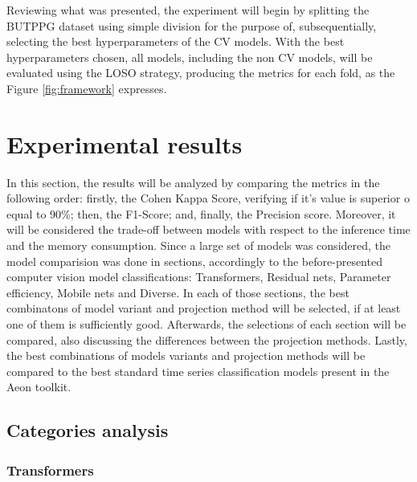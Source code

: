 

Reviewing what was presented, the experiment will begin by splitting the \acrshort{BUTPPG} dataset using simple division for the purpose of, subsequentially, selecting the best hyperparameters of the \acrshort{CV} models. With the best hyperparameters chosen, all models, including the non \acrshort{CV} models, will be evaluated using the \acrshort{LOSO} strategy, producing the metrics for each fold, as the Figure \ref{fig:framework} expresses.


\section{Experimental results}


In this section, the results will be analyzed by comparing the metrics in the following order: firstly, the Cohen Kappa Score, verifying if it's value is superior o equal to 90\%; then, the F1-Score; and, finally, the Precision score. Moreover, it will be considered the trade-off between models with respect to the inference time and the memory consumption. Since a large set of models was considered, the model comparision was done in sections, accordingly to the before-presented computer vision model classifications: Transformers, Residual nets, Parameter efficiency, Mobile nets and Diverse. In each of those sections, the best combinatons of model variant and projection method will be selected, if at least one of them is sufficiently good. Afterwards, the selections of each section will be compared, also discussing the differences between the projection methods. Lastly, the best combinations of models variants and projection methods will be compared to the best standard time series classification models present in the Aeon toolkit.

\pagebreak

\subsection{Categories analysis}

\subsubsection{Transformers}

